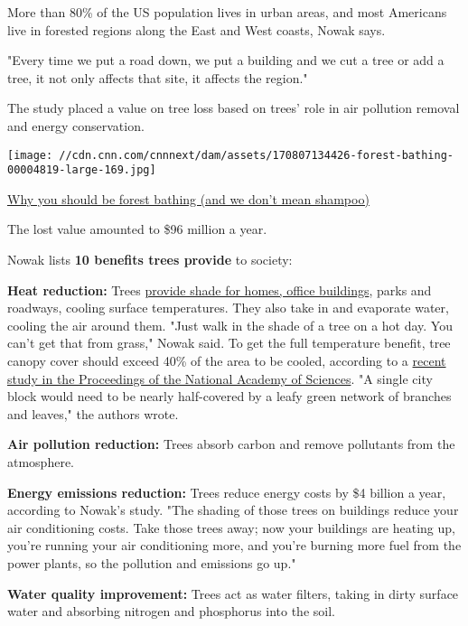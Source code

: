 More than 80\% of the US population lives in urban areas, and most
Americans live in forested regions along the East and West coasts, Nowak
says.

"Every time we put a road down, we put a building and we cut a tree or
add a tree, it not only affects that site, it affects the region."

The study placed a value on tree loss based on trees' role in air
pollution removal and energy conservation.

\href{/2017/08/10/health/forest-bathing/index.html}{}

\texttt{[image: //cdn.cnn.com/cnnnext/dam/assets/170807134426-forest-bathing-00004819-large-169.jpg]}

\href{/2017/08/10/health/forest-bathing/index.html}{Why you should be
forest bathing (and we don't mean shampoo)}

The lost value amounted to \$96 million a year.

Nowak lists \textbf{10 benefits trees provide} to society:

\textbf{Heat reduction:} Trees
\href{https://www.cnn.com/2019/07/19/us/heat-index-wxc-trnd/index.html}{provide
shade for homes, office buildings}, parks and roadways, cooling surface
temperatures. They also take in and evaporate water, cooling the air
around them. "Just walk in the shade of a tree on a hot day. You can't
get that from grass," Nowak said. To get the full temperature benefit,
tree canopy cover should exceed 40\% of the area to be cooled, according
to a
\href{https://www.sciencedaily.com/releases/2019/03/190325173305.htm}{recent
study in the Proceedings of the National Academy of Sciences}. "A single
city block would need to be nearly half-covered by a leafy green network
of branches and leaves," the authors wrote.

\textbf{Air pollution reduction:} Trees absorb carbon and remove
pollutants from the atmosphere.

\textbf{Energy emissions reduction:} Trees reduce energy costs by \$4
billion a year, according to Nowak's study. "The shading of those trees
on buildings reduce your air conditioning costs. Take those trees away;
now your buildings are heating up, you're running your air conditioning
more, and you're burning more fuel from the power plants, so the
pollution and emissions go up."

\textbf{Water quality improvement:} Trees act as water filters, taking
in dirty surface water and absorbing nitrogen and phosphorus into the
soil.

